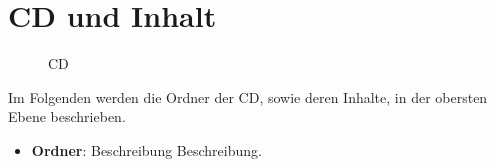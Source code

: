 \chapter{CD und Inhalt}

\begin{figure}[!ht]
\centering
{}
\caption{CD}
\label{tbl:a-cd}
\end{figure}

\clearpage

Im Folgenden werden die Ordner der CD, sowie deren Inhalte, in der obersten Ebene beschrieben. \newline

\begin{itemize}
  \setlength{\itemsep}{0.5cm}
  \item \textbf{Ordner}: Beschreibung \newline Beschreibung.
\end{itemize}
